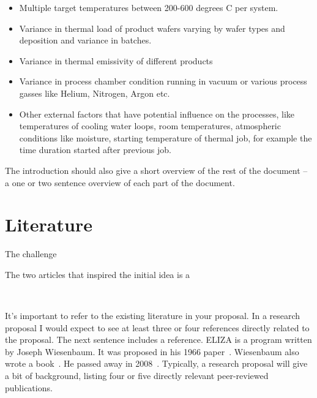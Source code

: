     \begin{itemize}
      \item Multiple target temperatures between 200-600 degrees C per system.
      \item Variance in thermal load of product wafers varying by wafer types and deposition 
      and variance in batches. 
      \item Variance in thermal emissivity of diﬀerent products
      \item Variance in process chamber condition running in vacuum or various process 
      gasses like Helium, Nitrogen, Argon etc. 
      \item Other external factors that have potential inﬂuence on the processes, 
      like temperatures of cooling water loops, room temperatures, atmospheric conditions 
      like moisture, starting temperature of thermal job, for example the time duration 
      started after previous job.
    \end{itemize}

    
    The introduction should also give a short overview of the rest of the
    document -- a one or two sentence overview of each part of the document.

  \section{Literature}
    The challenge 

    The two articles that inspired the initial idea is a 
    ~\cite{ArticleUnderwatervehicle}
    
    ~\cite{InprocDecoupledPIDNeeuralNet}

    It's important to refer to the existing literature in your proposal. In a
    research proposal I would expect to see at least three or four references
    directly related to the proposal. The next sentence includes a reference.
    ELIZA is a program written by Joseph Wiesenbaum. It was proposed in his 1966
    paper~\cite{weisenbaumeliza}.
    Wiesenbaum also wrote a book~\cite{weisenbaumcomputerpower}.
    He passed away in 2008~\cite{weisenbaumnytobituary}.
    \label{section:literature}
    Typically, a research proposal will give a bit of background, listing four
    or five directly relevant peer-reviewed publications.

